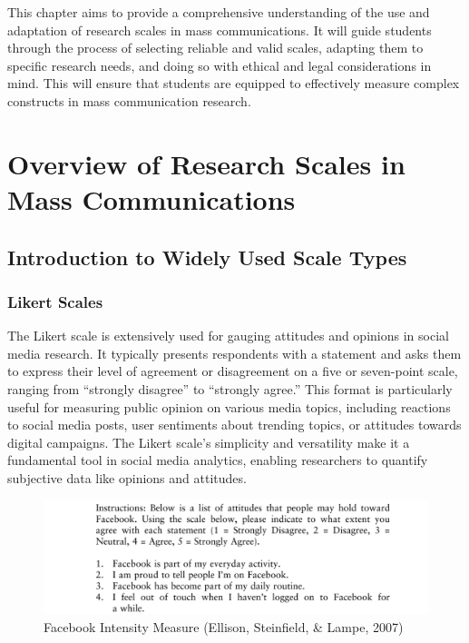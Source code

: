 \documentclass[
]{book}
\begin{document}
This chapter aims to provide a comprehensive understanding of the use and adaptation of research scales in mass communications. It will guide students through the process of selecting reliable and valid scales, adapting them to specific research needs, and doing so with ethical and legal considerations in mind. This will ensure that students are equipped to effectively measure complex constructs in mass communication research.

\hypertarget{overview-of-research-scales-in-mass-communications}{%
\section*{Overview of Research Scales in Mass Communications}\label{overview-of-research-scales-in-mass-communications}}

\hypertarget{introduction-to-widely-used-scale-types}{%
\subsection*{Introduction to Widely Used Scale Types}\label{introduction-to-widely-used-scale-types}}

\hypertarget{likert-scales}{%
\subsubsection*{Likert Scales}\label{likert-scales}}

The Likert scale is extensively used for gauging attitudes and opinions in social media research. It typically presents respondents with a statement and asks them to express their level of agreement or disagreement on a five or seven-point scale, ranging from ``strongly disagree'' to ``strongly agree.'' This format is particularly useful for measuring public opinion on various media topics, including reactions to social media posts, user sentiments about trending topics, or attitudes towards digital campaigns. The Likert scale's simplicity and versatility make it a fundamental tool in social media analytics, enabling researchers to quantify subjective data like opinions and attitudes.

\begin{figure}
\centering
\includegraphics[width=1\textwidth,height=\textheight]{images/likert.png}
\caption{Facebook Intensity Measure (Ellison, Steinfield, \& Lampe, 2007)}
\end{figure}
\end{document}
